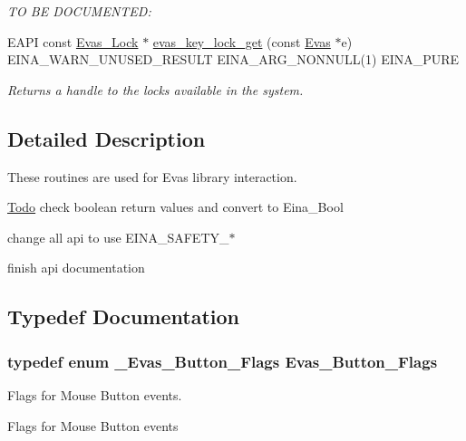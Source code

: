 \begin{DoxyCompactItemize}
\begin{DoxyCompactList}\small\item\em TO BE DOCUMENTED: \item\end{DoxyCompactList}\item 
EAPI const \hyperlink{Evas_8h_a791323b644ee831ead4c5d25552a0fd8}{Evas\_\-Lock} $\ast$ \hyperlink{Evas_8h_aa8af6d3610b4e937e79e761c8c4c7819}{evas\_\-key\_\-lock\_\-get} (const \hyperlink{group__Evas__Canvas_ga5ff87cc4ce6bc43e3b640a6d37f73043}{Evas} $\ast$e) EINA\_\-WARN\_\-UNUSED\_\-RESULT EINA\_\-ARG\_\-NONNULL(1) EINA\_\-PURE
\begin{DoxyCompactList}\small\item\em Returns a handle to the locks available in the system. \item\end{DoxyCompactList}\end{DoxyCompactItemize}


\subsection{Detailed Description}
These routines are used for Evas library interaction. \begin{Desc}
\item[\hyperlink{todo__todo000005}{Todo}]check boolean return values and convert to Eina\_\-Bool 

change all api to use EINA\_\-SAFETY\_\-$\ast$ 

finish api documentation \end{Desc}


\subsection{Typedef Documentation}
\subsubsection[{Evas\_\-Button\_\-Flags}]{\setlength{\rightskip}{0pt plus 5cm}typedef enum {\bf \_\-Evas\_\-Button\_\-Flags}  {\bf Evas\_\-Button\_\-Flags}}\label{Evas_8h_aae3a7dde94160cc18015784fb192bb2f}


Flags for Mouse Button events. 

Flags for Mouse Button events 
